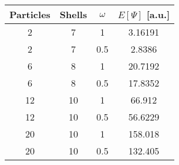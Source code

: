 \begin{tabular}{*{4}{c}}
  Particles & Shells & $\omega$ & $E[\Psi]$ [a.u.] \\
  \hline
  2&7&1&3.16191\\
  2&7&0.5	&2.8386\\
  6&8&1&20.7192\\
  6&8&0.5	&17.8352\\
  12&10&1&66.912\\
  12&10&0.5&56.6229\\
  20&10&1&158.018\\
  20&10&0.5&132.405\\
\end{tabular}
